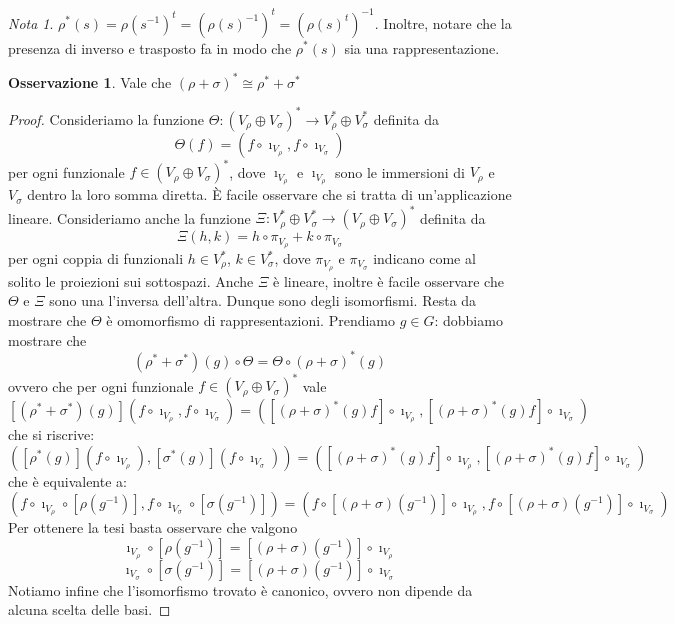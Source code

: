 \documentclass[11pt]{article}
\theoremstyle{plain}
\theoremstyle{definition}
\newtheorem*{rem}{Osservazione}
\theoremstyle{remark}
\newtheorem*{note}{Nota}
\begin{document}
\begin{note}
$\rho^*(s)=\rho(s^{-1})^t=\left(\rho(s)^{-1}\right)^t=\left(\rho(s)^t\right)^{-1}$. Inoltre, notare che la presenza di inverso e trasposto fa in modo che $\rho^*(s)$ sia una rappresentazione.
\end{note}


\begin{rem}
	Vale che $(\rho + \sigma)^* \cong \rho^* + \sigma^*$
\end{rem}

\begin{proof}
Consideriamo la funzione $\Theta : (V_\rho \oplus V_\sigma)^*\to V_\rho ^* \oplus V_\sigma ^*$ definita da
\[ \Theta(f) = (f\circ \imath_{V_\rho}, f\circ \imath_{V_\sigma}) \]
per ogni funzionale $f\in (V_\rho \oplus V_\sigma)^*$, dove $\imath_{V_\rho}$ e $\imath_{V_\rho}$ sono le immersioni di $V_\rho$ e $V_\sigma$ dentro la loro somma diretta.
\`E facile osservare che si tratta di un'applicazione lineare. Consideriamo anche
la funzione $\Xi: V_\rho ^* \oplus V_\sigma ^* \to (V_\rho \oplus V_\sigma)^*$ definita da
\[ \Xi(h,k) = h\circ\pi_{V_\rho} + k\circ\pi_{V_\sigma} \]
per ogni coppia di funzionali $h\in V_\rho ^*$, $k\in V_\sigma ^*$,
dove $\pi_{V_\rho}$ e $\pi_{V_\sigma}$ indicano come al solito le proiezioni sui sottospazi.
Anche $\Xi$ è lineare, inoltre è facile osservare che $\Theta$ e $\Xi$ sono una l'inversa dell'altra. Dunque sono degli
isomorfismi. Resta da mostrare che $\Theta$ è omomorfismo di rappresentazioni. Prendiamo $g\in G$: dobbiamo mostrare che
\[ (\rho^*+\sigma^*)(g) \circ \Theta = \Theta \circ (\rho + \sigma)^*(g) \]
ovvero che per ogni funzionale $f\in (V_\rho \oplus V_\sigma)^*$ vale
\[ [(\rho^*+\sigma^*)(g)] (f\circ \imath_{V_\rho}, f\circ \imath_{V_\sigma}) = ([(\rho + \sigma)^*(g)f]\circ \imath_{V_\rho}, [(\rho + \sigma)^*(g)f]\circ \imath_{V_\sigma}) \]
che si riscrive:
\[ ([\rho^*(g)](f\circ \imath_{V_\rho}), [\sigma^*(g)](f\circ \imath_{V_\sigma})) = ([(\rho + \sigma)^*(g)f]\circ \imath_{V_\rho}, [(\rho + \sigma)^*(g)f]\circ \imath_{V_\sigma}) \]
che è equivalente a:
\[ (f\circ \imath_{V_\rho} \circ [\rho(g^{-1})], f\circ \imath_{V_\sigma}\circ[\sigma(g^{-1})]) = (f\circ [(\rho+\sigma)(g^{-1})] \circ \imath_{V_\rho} , f\circ[(\rho+\sigma)(g^{-1})]\circ \imath_{V_\sigma}) \]
Per ottenere la tesi basta osservare che valgono
\[ \imath_{V_\rho} \circ [\rho(g^{-1})] = [(\rho+\sigma)(g^{-1})] \circ \imath_{V_\rho}\]
\[\imath_{V_\sigma} \circ [\sigma(g^{-1})] = [(\rho+\sigma)(g^{-1})] \circ \imath_{V_\sigma}\]
Notiamo infine che l'isomorfismo trovato è canonico, ovvero non dipende da alcuna scelta delle basi.
\end{proof}
\end{document}

